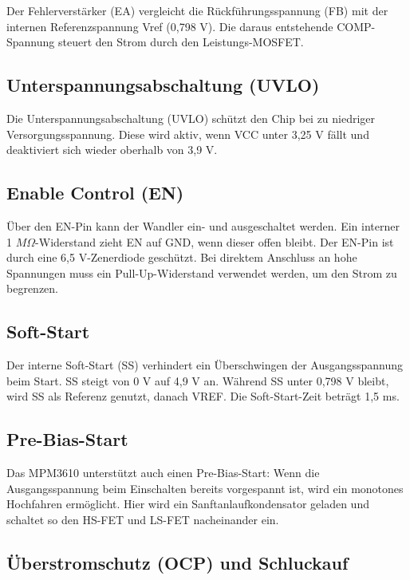 Der Fehlerverstärker (EA) vergleicht die Rückführungsspannung (FB) mit der internen Referenzspannung Vref (0,798 V). Die daraus entstehende COMP-Spannung steuert den Strom durch den Leistungs-MOSFET. \cite{MPS:2015}

\subsection{Unterspannungsabschaltung (UVLO)}

Die Unterspannungsabschaltung (UVLO) schützt den Chip bei zu niedriger Versorgungsspannung. Diese wird aktiv, wenn VCC unter 3,25 V fällt und deaktiviert sich wieder oberhalb von 3,9 V. \cite{MPS:2015}

\subsection{Enable Control (EN)}

Über den EN-Pin kann der Wandler ein- und ausgeschaltet werden. Ein interner 1 $M\Omega$-Widerstand zieht EN auf GND, wenn dieser offen bleibt. Der EN-Pin ist durch eine 6,5 V-Zenerdiode geschützt. Bei direktem Anschluss an hohe Spannungen muss ein Pull-Up-Widerstand verwendet werden, um den Strom zu begrenzen. \cite{MPS:2015}

\subsection{Soft-Start}

Der interne Soft-Start (SS) verhindert ein Überschwingen der Ausgangsspannung beim Start. SS steigt von 0 V auf 4,9 V an. Während SS unter 0,798 V bleibt, wird SS als Referenz genutzt, danach VREF. Die Soft-Start-Zeit beträgt 1,5 ms. \cite{MPS:2015}

\subsection{Pre-Bias-Start}

Das MPM3610 unterstützt auch einen Pre-Bias-Start: Wenn die Ausgangsspannung beim Einschalten bereits vorgespannt ist, wird ein monotones Hochfahren ermöglicht. Hier wird ein Sanftanlaufkondensator geladen und schaltet so den HS-FET und LS-FET nacheinander ein. \cite{MPS:2015}

\subsection{Überstromschutz (OCP) und Schluckauf}

